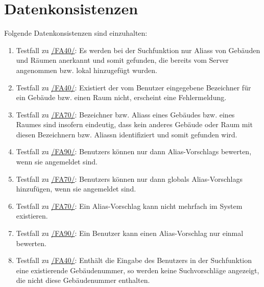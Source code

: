 \section{Datenkonsistenzen}

Folgende Datenkonsistenzen sind einzuhalten:
\begin{enumerate}[label=\textbf{/T\arabic*0/}, align=left, resume]
	\item \label{/T300/} Testfall zu \hyperref[/FA40/]{/FA40/}: Es werden bei der Suchfunktion nur \Glspl{Alias} von Gebäuden und Räumen anerkannt und somit gefunden, die bereits vom \Gls{Server} angenommen bzw. \gls{lokal} hinzugefügt wurden.
	\item \label{/T310/} Testfall zu \hyperref[/FA40/]{/FA40/}: Existiert der vom \Gls{Benutzer} eingegebene Bezeichner für ein Gebäude bzw. einen Raum nicht, erscheint eine Fehlermeldung.
	\item \label{/T320/} Testfall zu \hyperref[/FA70/]{/FA70/}: Bezeichner bzw. \Glspl{Alias} eines Gebäudes bzw. eines Raumes sind insofern eindeutig, dass kein anderes Gebäude oder Raum mit diesen Bezeichnern bzw. \Glspl{Alias}n identifiziert und somit gefunden wird.
	\item \label{/T330/} Testfall zu \hyperref[/FA90/]{/FA90/}: \Glspl{Benutzer} können nur dann \Glspl{Alias-Vorschlag} bewerten, wenn sie angemeldet sind.
	\item \label{/T340/} Testfall zu \hyperref[/FA70/]{/FA70/}: \Glspl{Benutzer} können nur dann \glspl{global} \Glspl{Alias-Vorschlag} hinzufügen, wenn sie angemeldet sind.
	\item \label{/T350/} Testfall zu \hyperref[/FA70/]{/FA70/}: Ein \Gls{Alias-Vorschlag} kann nicht mehrfach im System existieren.
	\item \label{/T360/} Testfall zu \hyperref[/FA90/]{/FA90/}: Ein \Gls{Benutzer} kann einen \Gls{Alias-Vorschlag} nur einmal bewerten.
	\item \label{/T370/} Testfall zu \hyperref[/FA40/]{/FA40/}: Enthält die Eingabe des \Gls{Benutzer}s in der Suchfunktion eine existierende Gebäudenummer, so werden keine Suchvorschläge angezeigt, die nicht diese Gebäudenummer enthalten.
\end{enumerate}